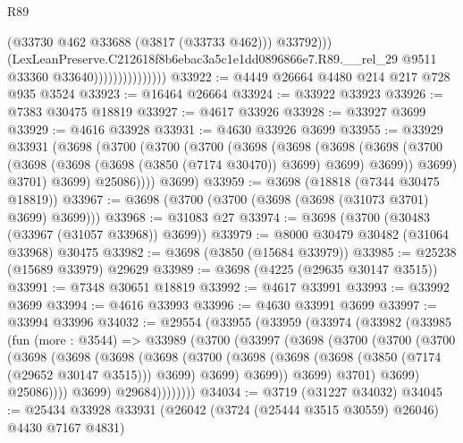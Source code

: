 \begin{lexlean}{R89}
\begin{coremodule}
                                      (@33730 @462 @33688 (@3817 (@33733 @462)))
                                      @33792)))
                                (LexLeanPreserve.C212618f8b6ebac3a5c1e1dd0896866e7.R89.__rel_29
                                  @9511
                                  @33360
                                  @33640)))))))))))))))
@33922 := @4449 @26664 @4480 @214 @217 @728 @935 @3524
@33923 := @16464 @26664
@33924 := @33922 @33923
@33926 := @7383 @30475 @18819
@33927 := @4617 @33926
@33928 := @33927 @3699
@33929 := @4616 @33928
@33931 := @4630 @33926 @3699
@33955 := @33929
    @33931
    (@3698
      (@3700
        (@3700
          (@3700
            (@3698
              (@3698
                (@3698
                  (@3698
                    (@3700 (@3698 (@3698 (@3698 (@3850 (@7174 @30470)) @3699) @3699) @3699))
                    @3699)
                  @3701)
                @3699)
              @25086))))
      @3699)
@33959 := @3698 (@18818 (@7344 @30475 @18819))
@33967 := @3698 (@3700 (@3700 (@3698 (@3698 (@31073 @3701) @3699) @3699)))
@33968 := @31083 @27
@33974 := @3698 (@3700 (@30483 (@33967 (@31057 @33968)) @3699))
@33979 := @8000 @30479 @30482 (@31064 @33968) @30475
@33982 := @3698 (@3850 (@15684 @33979))
@33985 := @25238 (@15689 @33979) @29629
@33989 := @3698 (@4225 (@29635 @30147 @3515))
@33991 := @7348 @30651 @18819
@33992 := @4617 @33991
@33993 := @33992 @3699
@33994 := @4616 @33993
@33996 := @4630 @33991 @3699
@33997 := @33994 @33996
@34032 := @29554
    (@33955
      (@33959
        (@33974
          (@33982
            (@33985
              (fun (more : @3544) =>
              @33989
                (@3700
                  (@33997
                    (@3698
                      (@3700
                        (@3700
                          (@3700
                            (@3698
                              (@3698
                                (@3698
                                  (@3698
                                    (@3700
                                      (@3698
                                        (@3698
                                          (@3698 (@3850 (@7174 (@29652 @30147 @3515))) @3699)
                                          @3699)
                                        @3699))
                                    @3699)
                                  @3701)
                                @3699)
                              @25086))))
                      @3699)
                    @29684))))))))
@34034 := @3719 (@31227 @34032)
@34045 := @25434 @33928 @33931 (@26042 (@3724 (@25444 @3515 @30559) @26046) @4430 @7167 @4831)

\end{coremodule}
\end{lexlean}
